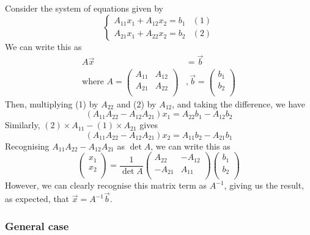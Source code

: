 \documentclass{../../template/note}
\begin{document}
    Consider the system of equations given by
    \[
        \begin{cases}
            A_{11}x_1 + A_{12}x_2 = b_1 & (1) \\
            A_{21}x_1 + A_{22}x_2 = b_2 & (2)
        \end{cases}
    \]
    We can write this as
    \begin{align*}
        A \vec x &= \vec b \\
        \text{where } A = \begin{pmatrix}
         A_{11} & A_{12} \\
         A_{21} & A_{22} \\
        \end{pmatrix}&, \vec b = \begin{pmatrix}
         b_1 \\
         b_2 \\
        \end{pmatrix}
    \end{align*}
    Then, multiplying (1) by \(A_{22}\) and (2) by \(A_{12}\), and taking the difference, we have
    \[
        (A_{11}A_{22} - A_{12}A_{21})x_1 = A_{22}b_1 - A_{12}b_2
    \]
    Similarly, \((2) \times A_{11} - (1) \times A_{21}\) gives
    \[
        (A_{11}A_{22} - A_{12}A_{21})x_2 = A_{11}b_2 - A_{21}b_1
    \]
    Recognising \(A_{11}A_{22} - A_{12}A_{21}\) as \(\det A\), we can write this as
    \[
        \begin{pmatrix}
         x_1 \\
         x_2 \\
        \end{pmatrix} = \frac{1}{\det A} \begin{pmatrix}
         A_{22} & -A_{12} \\
         -A_{21} & A_{11} \\
        \end{pmatrix} \begin{pmatrix}
         b_1 \\
         b_2 \\
        \end{pmatrix}
    \]
    However, we can clearly recognise this matrix term as \(A^{-1}\), giving us the result, as expected, that \(\vec x = A^{-1} \vec b\).

    \subsubsection{General case}
\end{document}
